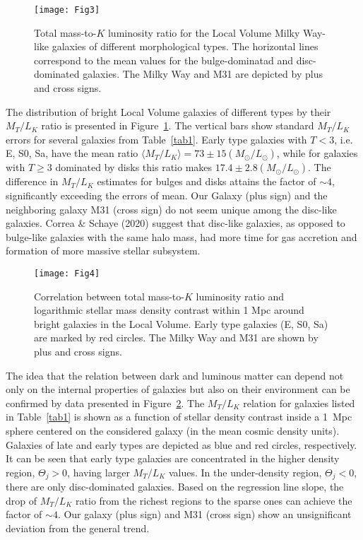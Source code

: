 \documentclass[proof]{WileyASNA-v1}
\begin{document}
\begin{figure}[t]
\centerline{\texttt{[image: Fig3]}}
\caption{Total mass-to-$K$ luminosity ratio for the Local Volume Milky Way-like
galaxies of different morphological types. The horizontal lines correspond to 
the mean values for the bulge-dominatad and disc-dominated galaxies. The Milky
Way and M31 are depicted by plus and cross signs.\label{fig3}}
\end{figure}

The distribution of bright Local Volume galaxies of different types by their
$M_T/L_K$ ratio is presented in Figure~\ref{fig3}. The vertical bars show
standard $M_T/L_K$ errors for several galaxies from Table~\ref{tab1}. Early type
galaxies with $T<3$, i.e. E, S0, Sa, have the mean ratio $\langle M_T/L_K\rangle
= 73\pm15(M_{\odot}/ L_{\odot})$, while for galaxies with $T\geq3$ dominated by
disks this ratio makes $17.4\pm2.8(M_{\odot}/L_{\odot})$. The difference in
$M_T/L_K$ estimates for bulges and disks attains the factor of $\sim4$,
significantly exceeding the errors of mean. Our Galaxy (plus sign) and the
neighboring galaxy M31 (cross sign) do not seem unique among the disc-like
galaxies. Correa \& Schaye (2020) suggest that disc-like galaxies, as opposed to
bulge-like galaxies with the same halo mass, had more time for gas accretion and
formation of more massive stellar subsystem.

\begin{figure}[t]
\centerline{\texttt{[image: Fig4]}}
\caption{Correlation between total mass-to-$K$ luminosity ratio and logarithmic 
stellar mass density contrast within 1 Mpc around bright galaxies in the Local
Volume. Early type galaxies (E, S0, Sa) are marked by red circles. The Milky Way
and M31 are shown by plus and cross signs.\label{fig4}}
\end{figure}

The idea that the relation between dark and luminous matter can depend not only
on the internal properties of galaxies but also on their environment can be
confirmed by data presented in Figure~\ref{fig4}. The $M_T/L_K$ relation for
galaxies listed in Table~\ref{tab1} is shown as a function of stellar density
contrast inside a 1~Mpc sphere centered on the considered galaxy (in the mean
cosmic density units). Galaxies of late and early types are depicted as blue
and red circles, respectively. It can be seen that early type galaxies are
concentrated in the higher density region, $\Theta_j>0$, having larger $M_T/L_K$
values. In the under-density region, $\Theta_j<0$, there are only disc-dominated
galaxies. Based on the regression line slope, the drop of $M_T/L_K$ ratio from
the richest regions to the sparse ones can achieve the factor of $\sim4$. Our
galaxy (plus sign) and M31 (cross sign) show an unsignificant deviation from the
general trend.
\end{document}
